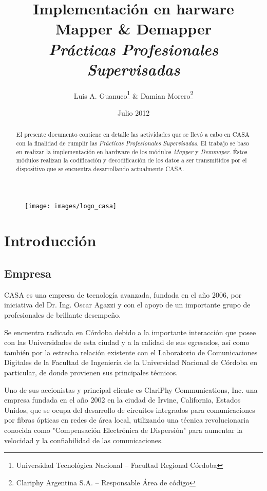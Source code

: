 \documentclass[a4paper]{article}
\author{
  Luis A. Guanuco\thanks{Universidad Tecnológica Nacional -- Facultad Regional Córdoba} \& 
  Damian Morero\thanks{Clariphy Argentina S.A. -- Responsable Área de código}}
\title{Implementación en harware \\ 
  Mapper \& Demapper \\ 
  \emph{\small{Prácticas Profesionales Supervisadas}}}
\date{Julio 2012}
\begin{document}
\maketitle

\begin{figure}[h]
  \centering
  \texttt{[image: images/logo\_casa]}
\end{figure}

\begin{abstract}
  El presente documento contiene en detalle las actividades que se llevó a cabo en \ac{CASA} con la finalidad de cumplir las \emph{Prácticas Profesionales Supervisadas}. El trabajo se baso en realizar la implementación en hardware de los módulos \emph{Mapper} y \emph{Demmaper}. Éstos módulos realizan la codificación y decodificación de los datos a ser transmitidos por el dispositivo que se encuentra desarrollando actualmente \ac{CASA}.
\end{abstract}

\section{Introducción}
\label{sec:intro}

\subsection{Empresa}
\label{sec:empresa}
\ac{CASA} es una empresa de tecnología avanzada, fundada en el año 2006, por iniciativa del Dr. Ing. Oscar Agazzi y con el apoyo de un importante grupo de profesionales de brillante desempeño.

Se encuentra radicada en Córdoba debido a la importante interacción que posee con las Universidades de esta ciudad y a la calidad de sus egresados, así como también por la estrecha relación existente con el Laboratorio de Comunicaciones Digitales de la Facultad de Ingeniería de la Universidad Nacional de Córdoba en particular, de donde provienen sus principales técnicos.

Uno de sus accionistas y principal cliente es ClariPhy Communications, Inc. una empresa fundada en el año 2002 en la ciudad de Irvine, California, Estados Unidos, que se ocupa del desarrollo de circuitos integrados para comunicaciones por fibras ópticas en redes de área local, utilizando una técnica revolucionaria conocida como "Compensación Electrónica de Dispersión" para aumentar la velocidad y la confiabilidad de las comunicaciones.
\end{document}
